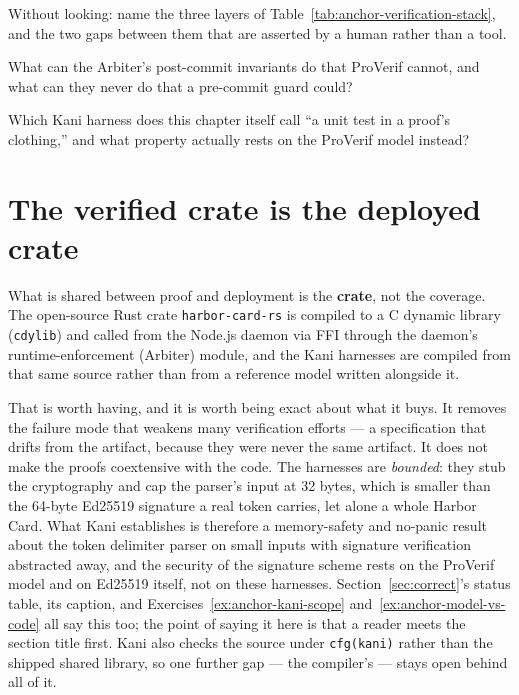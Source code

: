 \documentclass[11pt,a4paper]{article}
\theoremstyle{definition}
\begin{document}
\pdexercisepointer*{\ref{ex:anchor-algconfusion}}{\ref{ex:anchor-chain-replay}}{\pageref{ex:anchor-algconfusion}}
\begin{pdrecitation}
\item Without looking: name the three layers of Table~\ref{tab:anchor-verification-stack}, and the two gaps between them that are asserted by a human rather than a tool.
\item What can the Arbiter's post-commit invariants do that ProVerif cannot, and what can they never do that a pre-commit guard could?
\item Which Kani harness does this chapter itself call ``a unit test in a proof's clothing,'' and what property actually rests on the ProVerif model instead?
\end{pdrecitation}


\section{The verified crate is the deployed crate}\label{sec:implementation}

What is shared between proof and deployment is the \textbf{crate}, not the coverage. The
open-source Rust crate \texttt{harbor-card-rs} is compiled to a C dynamic library
(\texttt{cdylib}) and called from the Node.js daemon via FFI through the daemon's
runtime-enforcement (Arbiter) module, and the Kani harnesses are compiled from that
same source rather than from a reference model written alongside it.

That is worth having, and it is worth being exact about what it buys. It removes the
failure mode that weakens many verification efforts --- a specification that drifts
from the artifact, because they were never the same artifact. It does not make the
proofs coextensive with the code. The harnesses are \emph{bounded}: they stub the
cryptography and cap the parser's input at 32 bytes, which is smaller than the
64-byte Ed25519 signature a real token carries, let alone a whole Harbor Card. What
Kani establishes is therefore a memory-safety and no-panic result about the token
delimiter parser on small inputs with signature verification abstracted away, and the
security of the signature scheme rests on the ProVerif model and on Ed25519 itself,
not on these harnesses. Section~\ref{sec:correct}'s status table, its caption, and
Exercises~\ref{ex:anchor-kani-scope} and~\ref{ex:anchor-model-vs-code} all say this
too; the point of saying it here is that a reader meets the section title first.
Kani also checks the source under \texttt{cfg(kani)} rather than the shipped shared
library, so one further gap --- the compiler's --- stays open behind all of it.
\end{document}
